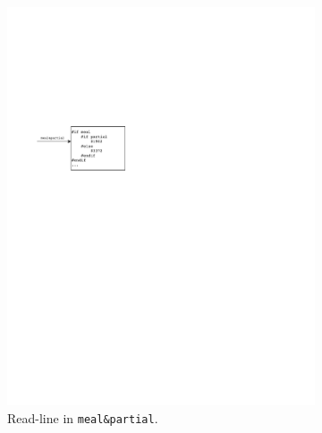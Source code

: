 \begin{figure}[!htb]
\begin{subfigure}[b]{.33\textwidth}
  \includegraphics[scale=0.75]{figures/vfile-Page-2.pdf}
  \caption{Read-line in \texttt{meal\&partial}.}
  \label{fig:file2}
\end{subfigure}
\begin{subfigure}[b]{.33\textwidth}
\centering

\end{subfigure}
\end{figure}
